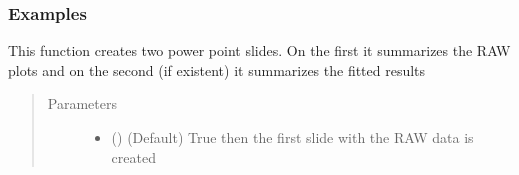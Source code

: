 \documentclass[letterpaper,10pt,english]{sphinxmanual}
\begin{document}
\begin{fulllineitems}
\begin{fulllineitems}
\begin{quote}
\begin{description}
\begin{itemize}
\end{itemize}

\end{description}\end{quote}
\subsubsection*{Examples}

\begin{sphinxVerbatim}[commandchars=\\\{\}]
  
\end{sphinxVerbatim}

\end{fulllineitems}


\begin{fulllineitems}
\label{\detokenize{plot_func:plot_func.TA.Save_Powerpoint}}
This function creates two power point slides. On the first it summarizes the RAW plots and on
the second (if existent) it summarizes the fitted results
\begin{quote}\begin{description}
\item[{Parameters}] \leavevmode\begin{itemize}
\item {} 
 (\sphinxstyleliteralemphasis{\sphinxupquote{, }}) \textendash{} (Default) True then the first slide with the RAW data is created


\end{itemize}
\end{description}
\end{quote}
\end{fulllineitems}
\end{fulllineitems}
\end{document}
